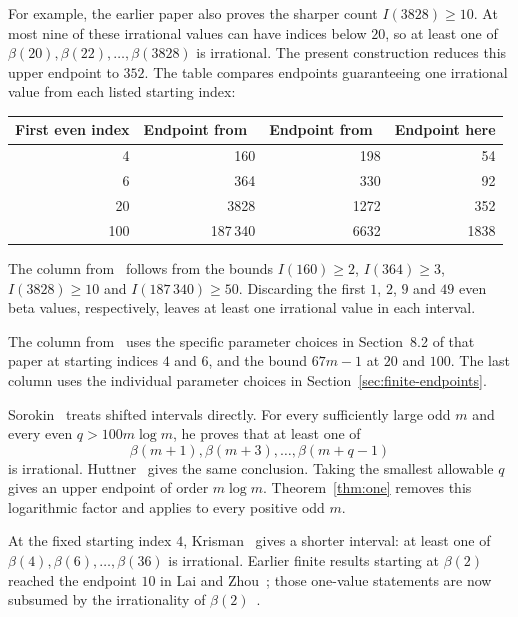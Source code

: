 For example, the earlier paper also proves the sharper count
$I(3828)\ge10$. At most nine of these irrational values
can have indices below $20$, so at least one of
$\beta(20),\beta(22),\ldots,\beta(3828)$ is irrational.
The present construction reduces this upper endpoint to $352$.
The table compares endpoints guaranteeing one irrational value
from each listed starting index:
\begin{center}
\begin{tabular}{@{}rrrr@{}}
\toprule
First even index&Endpoint from~\cite{Tcount}&Endpoint from~\cite{TshiftV1}&Endpoint here\\
\midrule
4&160&198&54\\
6&364&330&92\\
20&3828&1272&352\\
100&187\,340&6632&1838\\
\bottomrule
\end{tabular}
\end{center}
The column from~\cite{Tcount} follows from the bounds
$I(160)\ge2$, $I(364)\ge3$, $I(3828)\ge10$ and
$I(187\,340)\ge50$. Discarding the first $1$, $2$, $9$ and $49$
even beta values, respectively, leaves at least one irrational
value in each interval.

The column from~\cite{TshiftV1} uses the specific parameter
choices in Section~8.2 of that paper at starting indices $4$
and $6$, and the bound $67m-1$ at $20$ and $100$.
The last column uses the individual parameter choices in
Section~\ref{sec:finite-endpoints}.

Sorokin~\cite[Theorem~S]{S07} treats shifted intervals directly.
For every sufficiently large odd $m$ and every even
$q>100m\log m$, he proves that at least one of
\[
 \beta(m+1),\beta(m+3),\ldots,\beta(m+q-1)
\]
is irrational. Huttner~\cite[Remark~5]{H12} gives the same
conclusion. Taking the smallest allowable $q$ gives an upper
endpoint of order $m\log m$. Theorem~\ref{thm:one} removes
this logarithmic factor and applies to every positive odd $m$.

At the fixed starting index $4$, Krisman~\cite{K26} gives a
shorter interval: at least one of
$\beta(4),\beta(6),\ldots,\beta(36)$ is irrational.
Earlier finite results starting at $\beta(2)$ reached the endpoint
$10$ in Lai and Zhou~\cite[Theorem~6.1]{LZ22}; those one-value
statements are now subsumed by the irrationality of
$\beta(2)$~\cite{OAI26}.

